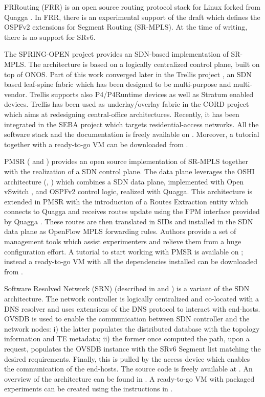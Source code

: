 FRRouting (FRR) \cite{frr} is an open source routing protocol stack for Linux forked from Quagga \cite{quagga}. In FRR, there is an experimental support \cite{frr-sr} of the draft \cite{ietf-ospf-segment-routing-extensions} which defines the OSPFv2 extensions for Segment Routing (SR-MPLS). At the time of writing, there is no support for SRv6.

The SPRING-OPEN project \cite{springopen} provides an SDN-based implementation of SR-MPLS. The architecture is based on a logically centralized control plane, built on top of ONOS. Part of this work converged later in the Trellis project \cite{trellis}, an SDN based leaf-spine fabric which has been designed to be multi-purpose and multi-vendor. Trellis supports also P4/P4Runtime \cite{p4} \cite{p4runtime} devices as well as Stratum \cite{stratum} enabled devices. Trellis has been used as underlay/overlay fabric in the CORD project \cite{cord} which aims at redesigning central-office architectures. Recently, it has been integrated in the SEBA project \cite{SEBA} which targets residential-access networks. All the software stack and the documentation is freely available on \cite{trellis}. Moreover, a tutorial together with a ready-to-go VM can be downloaded from \cite{trellis-tutorial}.

PMSR (\cite{pmsr} and \cite{trafficpmsr}) provides an open source implementation of SR-MPLS together with the realization of a SDN control plane. The data plane leverages the OSHI architecture (\cite{oshi1}, \cite{oshi2}) which combines a SDN data plane, implemented with Open vSwitch \cite{ovs}, and OSPFv2 control logic, realized with Quagga. This architecture is extended in PMSR with the introduction of a Routes Extraction entity which connects to Quagga and receives routes update using the FPM interface provided by Quagga \cite{quagga}. These routes are then translated in SIDs and installed in the SDN data plane as OpenFlow MPLS forwarding rules. Authors provide a set of management tools \cite{mantoo} which assist experimenters and relieve them from a huge configuration effort. A tutorial to start working with PMSR is available on \cite{pmsr-tutorial}; instead a ready-to-go VM with all the dependencies installed can be downloaded from \cite{oshi-home}.

Software Resolved Network (SRN) (described in \cite{lebrun2018software} and \cite{duchene2018exploring}) is a variant of the SDN architecture. The network controller is logically centralized and co-located with a DNS resolver and uses extensions of the DNS protocol to interact with end-hosts. OVSDB \cite{rfc7047} is used to enable the communication between SDN controller and the network nodes: i) the latter populates the distributed database with the topology information and TE metadata; ii) the former once computed the path, upon a request, populates the OVSDB instance with the SRv6 Segment list matching the desired requirements. Finally, this is pulled by the access device which enables the communication of the end-hosts. The source code is freely available at \cite{srn-code}. An overview of the architecture can be found in \cite{srn-overview}. A ready-to-go VM with packaged experiments can be created using the instructions in \cite{srn-vm}.

